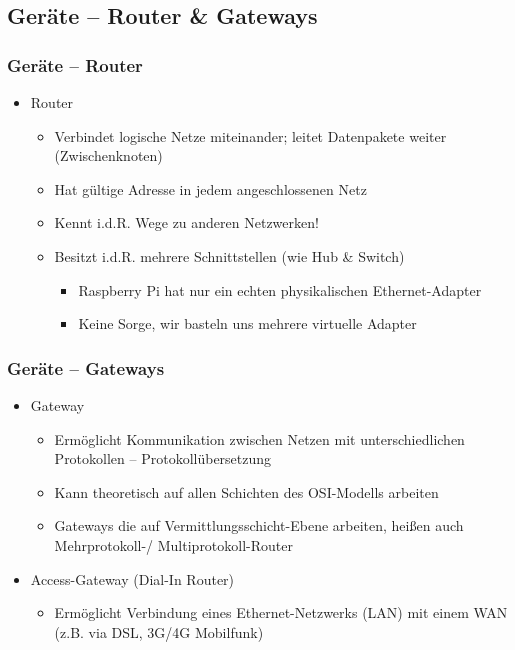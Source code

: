 \documentclass[xcolor=dvipsnames, aspectratio=169]{beamer}
\begin{document}
\subsection{Geräte -- Router \& Gateways}
\begin{frame}
	\frametitle{Geräte -- Router}
	\vspace{-0.75cm}
	\begin{itemize}
		\item Router
		\begin{itemize}
			\item Verbindet logische Netze miteinander; leitet Datenpakete weiter (Zwischenknoten)
			\item Hat gültige Adresse in jedem angeschlossenen Netz
			\item Kennt i.d.R. Wege zu anderen Netzwerken!
			\item Besitzt i.d.R. mehrere Schnittstellen (wie Hub \& Switch)
			\begin{itemize}
				\item Raspberry Pi hat nur ein echten physikalischen Ethernet-Adapter
				\item Keine Sorge, wir basteln uns mehrere virtuelle Adapter
			\end{itemize}
		\end{itemize}				
	\end{itemize}
\end{frame}
\begin{frame}
	\frametitle{Geräte -- Gateways}
	\begin{itemize}
		\item Gateway
		\begin{itemize}
			\item Ermöglicht Kommunikation zwischen Netzen mit unterschiedlichen Protokollen -- Protokollübersetzung
			\item Kann theoretisch auf allen Schichten des OSI-Modells arbeiten
			\item Gateways die auf Vermittlungsschicht-Ebene arbeiten, heißen auch Mehrprotokoll-/ Multiprotokoll-Router
		\end{itemize}
		\item Access-Gateway (Dial-In Router)
		\begin{itemize}
			\item Ermöglicht Verbindung eines Ethernet-Netzwerks (LAN) mit einem WAN (z.B. via DSL, 3G/4G Mobilfunk)
		\end{itemize}
	\end{itemize}
\end{frame}
\end{document}
